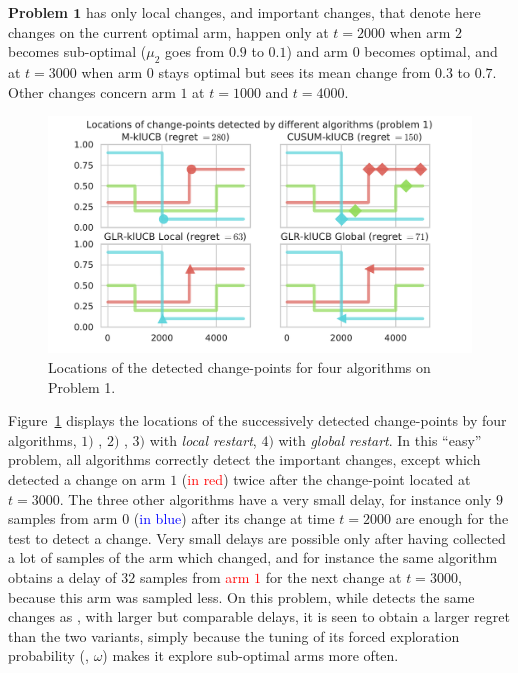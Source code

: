 

\textbf{Problem $\bm{1}$} has only local changes, and important changes, that denote here changes on the current optimal arm, happen only at $t=2000$ when arm $2$ becomes sub-optimal ($\mu_2$ goes from $0.9$ to $0.1$) and arm $0$ becomes optimal, and at $t=3000$ when arm $0$ stays optimal but sees its mean change from $0.3$ to $0.7$.
Other changes concern arm $1$ at $t=1000$ and $t=4000$.


\begin{figure}[h!]  %
    \centering
    \includegraphics[width=0.96\linewidth]{2-Chapters/6-Chapter/Images/Visualizing_locations_of_change_points_for_different_algorithms__4algs_Pb1.pdf}
    \caption{Locations of the detected change-points for four algorithms on Problem 1.}
    \label{fig:6:Visualizing_locations_of_change_points_for_different_algorithms__4algs_Pb1}
\end{figure}

Figure~\ref{fig:6:Visualizing_locations_of_change_points_for_different_algorithms__4algs_Pb1} displays the locations of the successively detected change-points by four algorithms,
$1)$ \MklUCB,
$2)$ \CUSUMklUCB,
$3)$ \GLRklUCB{} with \emph{local restart},
$4)$ \GLRklUCB{} with \emph{global restart}.
In this ``easy'' problem, all algorithms correctly detect the important changes, except \CUSUM{} which detected a change on arm $1$ (\textcolor{red}{in red}) twice after the change-point located at $t=3000$.
The three other algorithms have a very small delay, for instance only $9$ samples from arm $0$ (\textcolor{blue}{in blue}) after its change at time $t=2000$ are enough for the \GLR{} test to detect a change.
Very small delays are possible only after having collected a lot of samples of the arm which changed, and for instance the same algorithm obtains a delay of $32$ samples from \textcolor{red}{arm $1$} for the next change at $t=3000$, because this arm was sampled less.
On this problem, while \MklUCB{} detects the same changes as \GLRklUCB, with larger but comparable delays, it is seen to obtain a larger regret than the two \GLR{} variants, simply because the tuning of its forced exploration probability (\ie, $\omega$) makes it explore sub-optimal arms more often.

